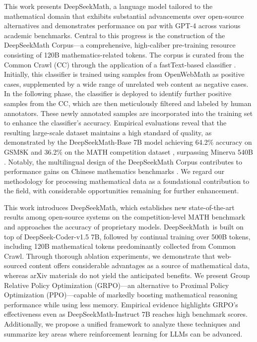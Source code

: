 This work presents DeepSeekMath, a language model tailored to the mathematical domain that exhibits substantial advancements over open-source alternatives and demonstrates performance on par with GPT-4 across various academic benchmarks. Central to this progress is the construction of the DeepSeekMath Corpus—a comprehensive, high-caliber pre-training resource consisting of 120B mathematics-related tokens. The corpus is curated from the Common Crawl (CC) through the application of a fastText-based classifier \citep{joulin2016fasttext}. Initially, this classifier is trained using samples from OpenWebMath \citep{openwebmath} as positive cases, supplemented by a wide range of unrelated web content as negative cases. In the following phase, the classifier is deployed to identify further positive samples from the CC, which are then meticulously filtered and labeled by human annotators. These newly annotated samples are incorporated into the training set to enhance the classifier’s accuracy. Empirical evaluations reveal that the resulting large-scale dataset maintains a high standard of quality, as demonstrated by the DeepSeekMath-Base 7B model achieving 64.2\% accuracy on GSM8K \citep{gsm8k} and 36.2\% on the MATH competition dataset \citep{MATH}, surpassing Minerva 540B \citep{minerva}. Notably, the multilingual design of the DeepSeekMath Corpus contributes to performance gains on Chinese mathematics benchmarks \citep{wei2023cmath,agieval}. We regard our methodology for processing mathematical data as a foundational contribution to the field, with considerable opportunities remaining for further enhancement.

This work introduces DeepSeekMath, which establishes new state-of-the-art results among open-source systems on the competition-level MATH benchmark and approaches the accuracy of proprietary models. DeepSeekMath~is built on top of DeepSeek-Coder-v1.5 7B, followed by continual training over 500B tokens, including 120B mathematical tokens predominantly collected from Common Crawl. Through thorough ablation experiments, we demonstrate that web-sourced content offers considerable advantages as a source of mathematical data, whereas arXiv materials do not yield the anticipated benefits. We present Group Relative Policy Optimization (GRPO)—an alternative to Proximal Policy Optimization (PPO)—capable of markedly boosting mathematical reasoning performance while using less memory. Empirical evidence highlights GRPO’s effectiveness even as DeepSeekMath-Instruct 7B reaches high benchmark scores. Additionally, we propose a unified framework to analyze these techniques and summarize key areas where reinforcement learning for LLMs can be advanced.

